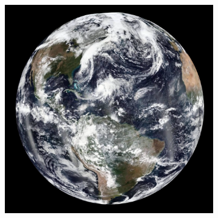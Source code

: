 \documentclass[journal]{vgtc}                %
\begin{document}
\begin{figure}[b]
\begin{subfigure}[tb]{0.32\linewidth}
	\end{subfigure}
    \begin{subfigure}[tb]{0.32\linewidth}
    	\includegraphics[width=\textwidth]{earth_temporal/earth_temporal_viirs3.png}
	\end{subfigure}


\end{figure}
\end{document}
